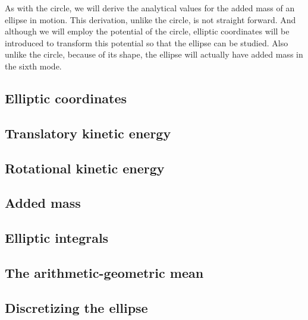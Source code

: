 As with the circle, we will derive the analytical values for the added mass of an ellipse in motion.
This derivation, unlike the circle, is not straight forward.
And although we will employ the potential of the circle, elliptic coordinates will be introduced to transform this potential so that the ellipse can be studied.
Also unlike the circle, because of its shape, the ellipse will actually have added mass in the sixth mode.


\subsection{Elliptic coordinates}


\subsection{Translatory kinetic energy}


\subsection{Rotational kinetic energy}


\subsection{Added mass}


\subsection{Elliptic integrals}


\subsection{The arithmetic-geometric mean}


\subsection{Discretizing the ellipse}

